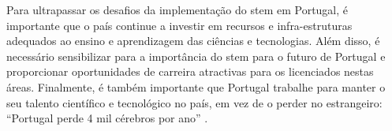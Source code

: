 



Para ultrapassar os desafios da implementação do \acrshort{stem} em Portugal, é importante que o país continue a investir em recursos e infra-estruturas adequados ao ensino e aprendizagem das ciências e tecnologias. Além disso, é necessário sensibilizar para a importância do \acrshort{stem} para o futuro de Portugal e proporcionar oportunidades de carreira atractivas para os licenciados nestas áreas. Finalmente, é também importante que Portugal trabalhe para manter o seu talento científico e tecnológico no país, em vez de o perder no estrangeiro: ``Portugal perde 4 mil cérebros por ano'' \cite{Cerdeira2020}.



